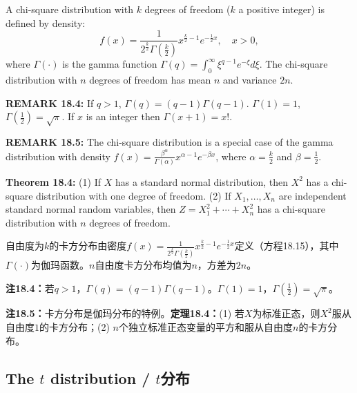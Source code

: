 \begin{original}
A chi-square distribution with $k$ degrees of freedom ($k$ a positive integer) is defined by density:
\[
f(x) = \frac{1}{2^{\frac{k}{2}}\Gamma(\frac{k}{2})} x^{\frac{k}{2}-1} e^{-\frac{1}{2}x}, \quad x > 0, \tag{18.15}
\]
where $\Gamma(\cdot)$ is the gamma function $\Gamma(q) = \int_0^{\infty} \xi^{q-1} e^{-\xi} d\xi$. The chi-square distribution with $n$ degrees of freedom has mean $n$ and variance $2n$.

\textbf{REMARK 18.4:} If $q > 1$, $\Gamma(q) = (q-1)\Gamma(q-1)$. $\Gamma(1) = 1$, $\Gamma(\frac{1}{2}) = \sqrt{\pi}$. If $x$ is an integer then $\Gamma(x+1) = x!$.

\textbf{REMARK 18.5:} The chi-square distribution is a special case of the gamma distribution with density $f(x) = \frac{\beta^\alpha}{\Gamma(\alpha)} x^{\alpha-1} e^{-\beta x}$, where $\alpha = \frac{k}{2}$ and $\beta = \frac{1}{2}$.

\textbf{Theorem 18.4:} (1) If $X$ has a standard normal distribution, then $X^2$ has a chi-square distribution with one degree of freedom. (2) If $X_1, \ldots, X_n$ are independent standard normal random variables, then $Z = X_1^2 + \cdots + X_n^2$ has a chi-square distribution with $n$ degrees of freedom.
\end{original}
\begin{translation}
自由度为$k$的卡方分布由密度$f(x) = \frac{1}{2^{\frac{k}{2}}\Gamma(\frac{k}{2})} x^{\frac{k}{2}-1} e^{-\frac{1}{2}x}$定义（方程18.15），其中$\Gamma(\cdot)$为伽玛函数。$n$自由度卡方分布均值为$n$，方差为$2n$。

\textbf{注18.4：}若$q > 1$，$\Gamma(q) = (q-1)\Gamma(q-1)$。$\Gamma(1) = 1$，$\Gamma(\frac{1}{2}) = \sqrt{\pi}$。

\textbf{注18.5：}卡方分布是伽玛分布的特例。\textbf{定理18.4：}(1) 若$X$为标准正态，则$X^2$服从自由度$1$的卡方分布；(2) $n$个独立标准正态变量的平方和服从自由度$n$的卡方分布。
\end{translation}

\subsection{The $t$ distribution / $t$分布}

